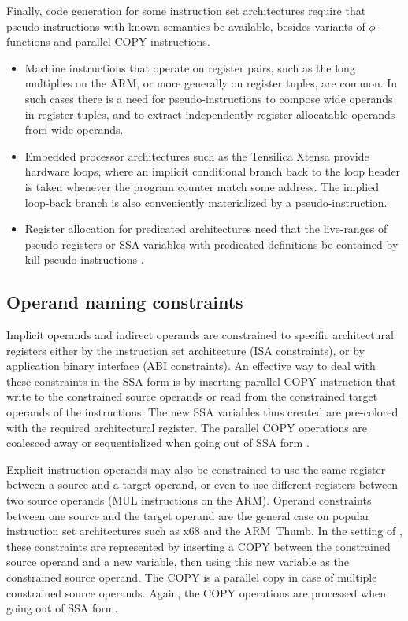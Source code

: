 Finally, code generation for some instruction set architectures require that
pseudo-instructions with known semantics be available, besides variants of
$\phi$-functions and parallel COPY instructions. \begin{itemize}

\item Machine instructions that operate on register pairs, such as the long
multiplies on the ARM, or more generally on register tuples, are common. In such
cases there is a need for pseudo-instructions to compose wide operands in
register tuples, and to extract independently register allocatable operands from
wide operands.

\item Embedded processor architectures such as the Tensilica Xtensa provide
hardware loops, where an implicit conditional branch back to the loop header is
taken whenever the program counter match some address. The implied loop-back
branch is also conveniently materialized by a pseudo-instruction.

\item Register allocation for predicated architectures need that the live-ranges
of pseudo-registers or SSA variables with predicated definitions be contained by
kill pseudo-instructions \cite{Gillies:1996:MICRO}.

\end{itemize}

\subsection{Operand naming constraints}

Implicit operands and indirect operands are constrained to specific
architectural registers either by the instruction set architecture (ISA
constraints), or by application binary interface (ABI constraints). An effective
way to deal with these constraints in the SSA form is by inserting parallel COPY
instruction that write to the constrained source operands or read from the
constrained target operands of the instructions. The new SSA variables thus
created are pre-colored with the required architectural register. The parallel
COPY operations are coalesced away or sequentialized when going out of SSA form
\cite{Boissinot:2009:CGO}.

Explicit instruction operands may also be constrained to use the same register
between a source and a target operand, or even to use different registers
between two source operands (MUL instructions on the ARM). Operand constraints
between one source and the target operand are the general case on popular
instruction set architectures such as x68 and the ARM~Thumb. In the setting of
\cite{Boissinot:2009:CGO}, these constraints are represented by inserting a COPY
between the constrained source operand and a new variable, then using this new
variable as the constrained source operand. The COPY is a parallel copy in case
of multiple constrained source operands. Again, the COPY operations are
processed when going out of SSA form.

